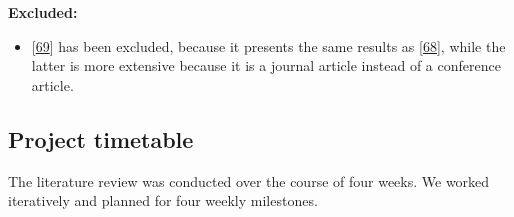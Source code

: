 \documentclass[]{book}
\providecommand{\tightlist}{%
  \setlength{\itemsep}{0pt}\setlength{\parskip}{0pt}}
\begin{document}
\textbf{Excluded:}

\begin{itemize}
\tightlist
\item
  {[}\protect\hyperlink{ref-khomh2012a}{69}{]} has been excluded,
  because it presents the same results as
  {[}\protect\hyperlink{ref-khomh2015a}{68}{]}, while the latter is more
  extensive because it is a journal article instead of a conference
  article.
\end{itemize}

\subsection{Project timetable}\label{project-timetable}

The literature review was conducted over the course of four weeks. We
worked iteratively and planned for four weekly milestones.
\end{document}
